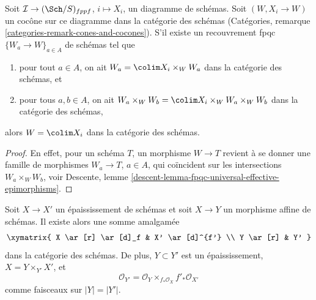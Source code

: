 \begin{lemma}
\label{lemma-pushout-fpqc-local}
Soit $\mathcal{I} \to (\Sch/S)_{fppf}$, $i \mapsto X_i$, un diagramme de schémas.
Soit $(W, X_i \to W)$ un cocône sur ce diagramme dans la catégorie des schémas
(Catégories, remarque \ref{categories-remark-cones-and-cocones}).
S'il existe un recouvrement fpqc $\{W_a \to W\}_{a \in A}$ de schémas tel que
\begin{enumerate}
\item pour tout $a \in A$, on ait
$W_a = \colim X_i \times_W W_a$
dans la catégorie des schémas, et
\item pour tous $a, b \in A$, on ait
$W_a \times_W W_b = \colim X_i \times_W W_a \times_W W_b$
dans la catégorie des schémas,
\end{enumerate}
alors $W = \colim X_i$ dans la catégorie des schémas.
\end{lemma}

\begin{proof}
En effet, pour un schéma $T$, un morphisme $W \to T$ revient à se donner
une famille de morphismes $W_a \to T$, $a \in A$, qui coïncident sur les
intersections $W_a \times_W W_b$, voir
Descente, lemme \ref{descent-lemma-fpqc-universal-effective-epimorphisms}.
\end{proof}

\begin{lemma}
\label{lemma-pushout-along-thickening}
Soit $X \to X'$ un épaississement de schémas et soit $X \to Y$ un morphisme
affine de schémas. Il existe alors une somme amalgamée
$$
\xymatrix{
X \ar[r] \ar[d]_f
&
X' \ar[d]^{f'}
\\
Y \ar[r]
&
Y'
}
$$
dans la catégorie des schémas. De plus, $Y \subset Y'$ est un
épaississement, $X = Y \times_{Y'} X'$, et
$$
\mathcal{O}_{Y'} = \mathcal{O}_Y \times_{f_*\mathcal{O}_X} f'_*\mathcal{O}_{X'}
$$
comme faisceaux sur $|Y| = |Y'|$.
\end{lemma}

